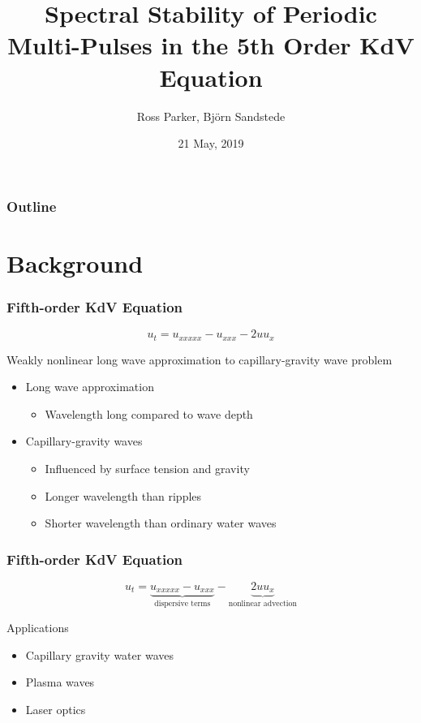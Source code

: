 \documentclass[16pt]{beamer}
\title[Stability of Multi-Pulses]{Spectral Stability of Periodic Multi-Pulses in the 5th Order KdV Equation}
\author[R. Parker]{Ross Parker, Bj\"{o}rn Sandstede}
\institute{Brown University}
\date{21 May, 2019}
\begin{document}
 
\frame{\titlepage}
 
\begin{frame}
\frametitle{Outline}
\tableofcontents
\end{frame}

\section{Background}

\begin{frame}
	\frametitle{Fifth-order KdV Equation }   
	\fontsize{16}{7.2}\selectfont
	\begin{center}
		\[ u_t = u_{xxxxx} - u_{xxx} - 2 u u_x \]
	\end{center}
	\vspace{0.5cm}
	Weakly nonlinear long wave approximation to capillary-gravity wave problem
	\vspace{0.5cm}
	\begin{itemize}
		\item Long wave approximation
		\begin{itemize} 
			\item Wavelength long compared to wave depth
		\end{itemize}
		\item Capillary-gravity waves
		\begin{itemize}
		    \item Influenced by surface tension and gravity
		    \item Longer wavelength than ripples
		    \item Shorter wavelength than ordinary water waves 
		\end{itemize}
	\end{itemize}
\end{frame}

\begin{frame}
	\frametitle{Fifth-order KdV Equation}
	\fontsize{16}{7.2}\selectfont
	\begin{description}
		\item
			\begin{center}
			\[ u_t = \underbrace{u_{xxxxx} - u_{xxx}}_{\text{dispersive terms}} - \underbrace{ 2 u u_x}_{\text{nonlinear advection}} \]
			\end{center}
		\vspace{0.5cm}

		Applications
		\begin{itemize}
			\item Capillary gravity water waves
			\vspace{0.25cm}	
			\item Plasma waves
			\vspace{0.25cm}
			\item Laser optics
		\end{itemize}
	\end{description}
\end{frame}
\end{document}
